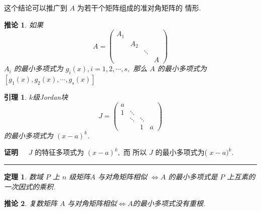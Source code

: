 \documentclass[13pt]{beamer}
\newtheorem{thm}{定理}
\newtheorem{lem}{引理}
\newtheorem*{coro}{推论}
\def\qed{\nopagebreak\hfill{\rule{4pt}{7pt}}\medbreak}
\def\pf{{\bf 证明~~ }}
\def\A{\mathscr{A}}
\begin{document}
\begin{frame}
这个结论可以推广到 $A$ 为若干个矩阵组成的准对角矩阵的 情形.
\begin{coro}
如果
\[
{A}=\left(\begin{array}{cccc}
{A}_{1} & & & \\
& {A}_{2} & & \\
& & \ddots & \\
& & & {A}
\end{array}\right)
\]
${A}_{i}$ 的最小多项式为 $g_{i}(x), i=1,2, \cdots, s,$ 那么 ${A}$ 的最小多项式为
$\left[g_{1}(x), g_{2}(x), \cdots, g_{s}(x)\right]$
\end{coro}
\end{frame}


\begin{frame}
\begin{lem}
$k$级Jordan块
\[
{J}=\left(\begin{array}{cccc}
a & & & \\
1 & \ddots & & \\
& \ddots & \ddots & \\
& & 1 & a
\end{array}\right)
\]
的最小多项式为 $(x-a)^{k}$.
\end{lem}
\pf 
${J}$ 的特征多项式为 $(x-a)^{k},$ 而
所以 $J$ 的最小多项式为( $x-a)^{k}$. 
\qed
\end{frame}


\begin{frame}

\begin{thm}
数域 $P$ 上 $n$ 级矩阵$A$ 与对角矩阵相似  $\Leftrightarrow A$ 的最小多项式是 $P$ 上互素的一次因式的乘积. 
\end{thm}
%

\begin{coro}
复数矩阵 $A$ 与对角矩阵相似$\Leftrightarrow  A$的最小多项式没有重根.
\end{coro}
\end{frame} 
\end{document}
